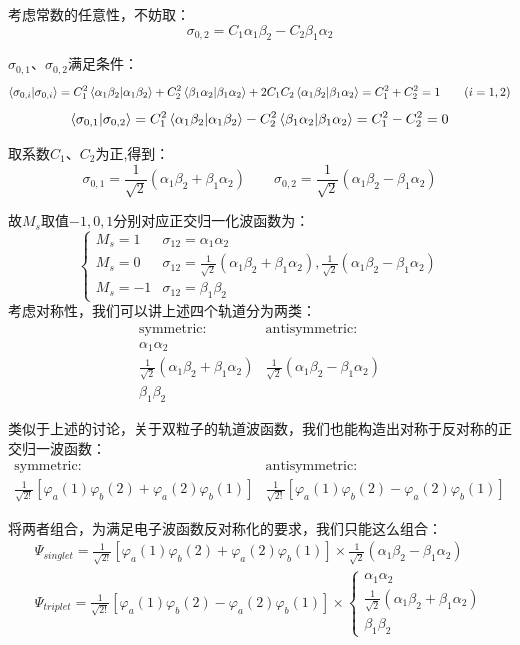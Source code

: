 考虑常数的任意性，不妨取：
\[\sigma_{0,2}= C_1\alpha_1\beta_2-C_2\beta_1\alpha_2\]

$\sigma_{0,1}$、$\sigma_{0,2}$满足条件：
\[\bra{\sigma_{0,i}}\ket{\sigma_{0,i}}=C_1^2\bra{\alpha_1\beta_2}\ket{\alpha_1\beta_2}+C_2^2\bra{\beta_1\alpha_2}\ket{\beta_1\alpha_2}+2C_1C_2\bra{\alpha_1\beta_2}\ket{\beta_1\alpha_2}=C_1^2+C_2^2=1 \qquad (i=1,2)\]
\[\bra{\sigma_{0,1}}\ket{\sigma_{0,2}}=C_1^2\bra{\alpha_1\beta_2}\ket{\alpha_1\beta_2}-C_2^2\bra{\beta_1\alpha_2}\ket{\beta_1\alpha_2}=C_1^2-C_2^2=0\]

取系数$C_1$、$C_2$为正,得到：
\[\sigma_{0,1}=\frac{1}{\sqrt{2}}(\alpha_1\beta_2+\beta_1\alpha_2) \qquad \sigma_{0,2}= \frac{1}{\sqrt{2}}(\alpha_1\beta_2-\beta_1\alpha_2)\]

故$M_s$取值$-1,0,1$分别对应正交归一化波函数为：
\[ 
    \left \{
    \begin{array}{ll}
        M_s=1  & \sigma_{12}=\alpha_1\alpha_2\\
        M_s=0  & \sigma_{12}=\frac{1}{\sqrt{2}}(\alpha_1\beta_2+\beta_1\alpha_2),\frac{1}{\sqrt{2}}(\alpha_1\beta_2-\beta_1\alpha_2)\\
        M_s=-1 & \sigma_{12}=\beta_1\beta_2
    \end{array}
    \right .
\]
考虑对称性，我们可以讲上述四个轨道分为两类：
\[ 
    \begin{array}{ll}
        \text{symmetric}: & \text{antisymmetric}: \\
         \alpha_1\alpha_2\\
         \frac{1}{\sqrt{2}}(\alpha_1\beta_2+\beta_1\alpha_2) & \frac{1}{\sqrt{2}}(\alpha_1\beta_2-\beta_1\alpha_2)\\
         \beta_1\beta_2
    \end{array}
\]

类似于上述的讨论，关于双粒子的轨道波函数，我们也能构造出对称于反对称的正交归一波函数：
\[
    \begin{array}{ll}
        \text{symmetric}: & \text{antisymmetric}: \\
        \frac{1}{\sqrt{2!}}[\varphi_a(1)\varphi_b(2)+\varphi_a(2)\varphi_b(1)] & \frac{1}{\sqrt{2!}}[\varphi_a(1)\varphi_b(2)-\varphi_a(2)\varphi_b(1)] 
    \end{array}
\]

将两者组合，为满足电子波函数反对称化的要求，我们只能这么组合：
\[
    \begin{array}{l}
        \varPsi_{singlet}=\frac{1}{\sqrt{2!}}[\varphi_a(1)\varphi_b(2)+\varphi_a(2)\varphi_b(1)]\times\frac{1}{\sqrt{2}}(\alpha_1\beta_2-\beta_1\alpha_2)\\
        \varPsi_{triplet}=\frac{1}{\sqrt{2!}}[\varphi_a(1)\varphi_b(2)-\varphi_a(2)\varphi_b(1)]\times \left \{
            \begin{array}{l}
                \alpha_1\alpha_2\\
                \frac{1}{\sqrt{2}}(\alpha_1\beta_2+\beta_1\alpha_2)\\
                \beta_1\beta_2
            \end{array}
        \right .
    \end{array}
\]

